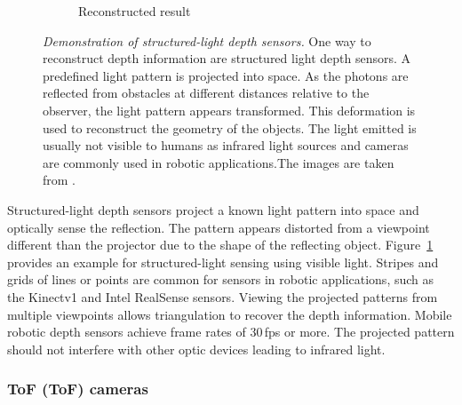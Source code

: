 \begin{figure}[H]
\begin{subfigure}[t]{0.45\textwidth}
        \caption{Reconstructed result}
    \end{subfigure}
    \caption[Demonstration of structured-light depth sensors]{\emph{Demonstration of structured-light depth sensors.} One way to reconstruct depth information are structured light depth sensors. A predefined light pattern is projected into space. As the photons are reflected from obstacles at different distances relative to the observer, the light pattern appears transformed. This deformation is used to reconstruct the geometry of the objects. The light emitted is usually not visible to humans as infrared light sources and cameras are commonly used in robotic applications.The images are taken from \cite{sl_depthsensor_calibration}.}\label{fig:sl_face}
\end{figure}
Structured-light depth sensors project a known light pattern into space and optically sense the reflection.
The pattern appears distorted from a viewpoint different than the projector due to the shape of the reflecting object.
Figure~\ref{fig:sl_face} provides an example for structured-light sensing using visible light.
Stripes and grids of lines or points are common for sensors in robotic applications, such as the Kinectv1 and Intel RealSense\cite{intel_realsense} sensors.
Viewing the projected patterns from multiple viewpoints allows triangulation to recover the depth information.
Mobile robotic depth sensors achieve frame rates of 30\,\acrshort{fps} or more.
The projected pattern should not interfere with other optic devices leading to infrared light.

\subsubsection{\acrlong{ToF} (\acrshort{ToF}) cameras}

